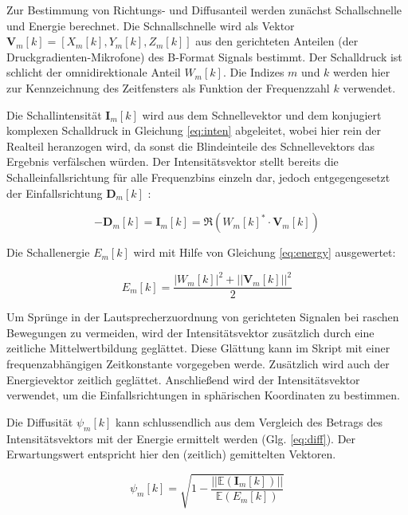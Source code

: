 Zur Bestimmung von Richtungs- und Diffusanteil werden zunächst Schallschnelle und Energie berechnet. Die Schnallschnelle wird als Vektor $\textbf{V}_{m}[k] = [X_{m}[k], Y_{m}[k], Z_{m}[k]]$ aus den gerichteten Anteilen (der Druckgradienten-Mikrofone) des B-Format Signals bestimmt. Der Schalldruck ist schlicht der omnidirektionale Anteil $W_{m}[k]$. Die Indizes $m$ und $k$ werden hier zur Kennzeichnung des Zeitfensters als Funktion der Frequenzzahl $k$ verwendet.

Die Schallintensität $\textbf{I}_{m}[k]$ wird aus dem Schnellevektor und dem konjugiert komplexen Schalldruck in Gleichung \ref{eq:inten} abgeleitet, wobei hier rein der Realteil heranzogen wird, da sonst die Blindeinteile des Schnellevektors das Ergebnis verfälschen würden. Der Intensitätsvektor stellt bereits die Schalleinfallsrichtung für alle Frequenzbins einzeln dar, jedoch entgegengesetzt der Einfallsrichtung $\textbf{D}_{m}[k]$ :

\begin{equation}
    -\textbf{D}_{m}[k] = \textbf{I}_{m}[k] = \Re(W_{m}[k]^{*} \cdot \textbf{V}_{m}[k])
    \label{eq:inten}
\end{equation}

Die Schallenergie $E_{m}[k]$ wird mit Hilfe von Gleichung \ref{eq:energy} ausgewertet:

\begin{equation}
    E_{m}[k] = \frac{|W_{m}[k]|^2+||\textbf{V}_{m}[k]||^2}{2}
    \label{eq:energy}
\end{equation}

Um Sprünge in der Lautsprecherzuordnung von gerichteten Signalen bei raschen Bewegungen zu vermeiden, wird der Intensitätsvektor zusätzlich durch eine zeitliche Mittelwertbildung geglättet. Diese Glättung kann im Skript mit einer frequenzabhängigen Zeitkonstante vorgegeben werde. Zusätzlich wird auch der Energievektor zeitlich geglättet. Anschließend wird der Intensitätsvektor verwendet, um die Einfallsrichtungen in sphärischen Koordinaten zu bestimmen.

Die Diffusität $\psi_{m}[k]$ kann schlussendlich aus dem Vergleich des Betrags des Intensitätsvektors mit der Energie ermittelt werden (Glg. \ref{eq:diff}). Der Erwartungswert entspricht hier den (zeitlich) gemittelten Vektoren.

\begin{equation}
    \psi_{m}[k] = \sqrt{1 - \frac{||\mathbb{E}(\textbf{I}_{m}[k])||}{\mathbb{E}(E_{m}[k])}}
    \label{eq:diff}
\end{equation}

